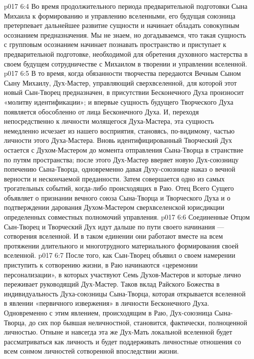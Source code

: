 \vs p017 6:4 \bibnobreakspace {} Во время продолжительного периода предварительной подготовки Сына Михаила к формированию и управлению вселенными, его будущая союзница претерпевает дальнейшее развитие сущности и начинает обладать совокупным осознанием предназначения. Мы не знаем, но догадываемся, что такая сущность с групповым осознанием начинает познавать пространство и приступает к предварительной подготовке, необходимой для обретения духовного мастерства в своем будущем сотрудничестве с Михаилом в творении и управлении вселенной.
\vs p017 6:5 \bibnobreakspace {} В то время, когда обязанности творчества передаются Вечным Сыном Сыну Михаилу, Дух\hyp{}Мастер, управляющий сверхвселенной, для которой этот новый Сын\hyp{}Творец предназначен, в присутствии Бесконечного Духа произносит «молитву идентификации»; и впервые сущность будущего Творческого Духа появляется обособленно от лица Бесконечного Духа. И, переходя непосредственно к личности молящегося Духа\hyp{}Мастера, эта сущность немедленно исчезает из нашего восприятия, становясь, по\hyp{}видимому, частью личности этого Духа\hyp{}Мастера. Вновь идентифицированный Творческий Дух остается с Духом\hyp{}Мастером до момента отправления Сына\hyp{}Творца в странствие по путям пространства; после этого Дух\hyp{}Мастер вверяет новую Дух\hyp{}союзницу попечению Сына\hyp{}Творца, одновременно давая Духу\hyp{}союзнице наказ о вечной верности и нескончаемой преданности. Затем совершается одно из самых трогательных событий, когда\hyp{}либо происходящих в Раю. Отец Всего Сущего объявляет о признании вечного союза Сына\hyp{}Творца и Творческого Духа и о подтверждении дарования Духом\hyp{}Мастером сверхвселенской юрисдикции определенных совместных полномочий управления.
\vs p017 6:6 Соединенные Отцом Сын\hyp{}Творец и Творческий Дух идут дальше по пути своего начинания --- сотворения вселенной. И в таком единении они работают вместе на всем протяжении длительного и многотрудного материального формирования своей вселенной.
\vs p017 6:7 \bibnobreakspace {} После того, как Сын\hyp{}Творец объявил о своем намерении приступить к сотворению жизни, в Раю начинаются «церемонии персонализации», в которых участвуют Семь Духов\hyp{}Мастеров и которые лично переживает руководящий Дух\hyp{}Мастер. Таков вклад Райского Божества в индивидуальность Духа\hyp{}союзницы Сына\hyp{}Творца, которая открывается вселенной в явлении «первичного извержения» в личности Бесконечного Духа. Одновременно с этим явлением, происходящим в Раю, Дух\hyp{}союзница Сына\hyp{}Творца, до сих пор бывшая неличностной, становится, фактически, полноценной личностью. Отныне и навсегда эта же Дух\hyp{}Мать локальной вселенной будет рассматриваться как личность и будет поддерживать личностные отношения со всем сонмом личностей сотворенной впоследствии жизни.
